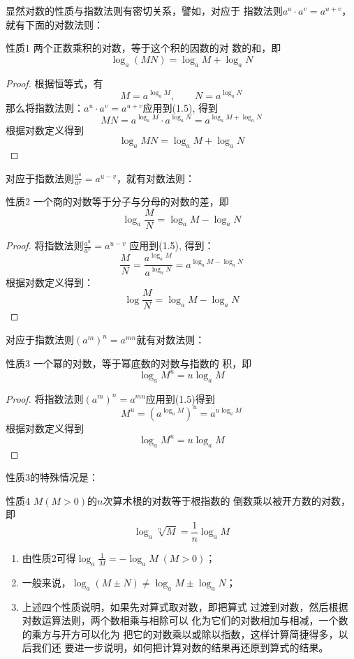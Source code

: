 显然对数的性质与指数法则有密切关系，譬如，对应于
指数法则$a^u\cdot a^v=a^{u+v}$，就有下面的对数法则：

\begin{blk}{性质1}
    两个正数乘积的对数，等于这个积的因数的对
数的和，即
\[\log_a(MN)=\log_a M+\log_a N\]
\end{blk}

\begin{proof}
    根据恒等式，有
    \begin{equation}
        M=a^{\log_a M},\qquad N=a^{\log_a N}
    \end{equation}
    那么将指数法则：$a^u\cdot a^v=a^{u+v}$应用到(1.5), 得到
\[MN=a^{\log_a M}\cdot a^{\log_a N}=a^{\log_a M+\log_a N}\]
    根据对数定义得到
    \[\log_a MN = \log_a M + \log_a N\]
\end{proof}    

对应于指数法则$\frac{a^u}{a^v}=a^{u-v}$，就有对数法则：
    
\begin{blk}{性质2}
    一个商的对数等于分子与分母的对数的差，即
    \[\log_a \frac{M}{N}=\log_a M-\log_a N\]
\end{blk}

\begin{proof}
将指数法则$\frac{a^u}{a^v}=a^{u-v}$
应用到(1.5), 得到：
\[\frac{M}{N}=\frac{a^{\log_a M}}{a^{\log_a N}}=a^{\log_a M-\log_a N}\]
根据对数定义得到：
\[\log\frac{M}{N}=\log_a M -\log_a N\]
\end{proof}    

对应于指数法则$(a^m)^n=a^{mn}$就有对数法则： 
\begin{blk}{性质3}
    一个幂的对数，等于幂底数的对数与指数的
积，即
\[\log_a M^u =u\log_a M\]
\end{blk}
  
\begin{proof}
    将指数法则$(a^m)^n=a^{mn}$应用到(1.5)得到
\[M^u=\left(a^{\log_a M}\right)^u=a^{u\log_a M}\]
根据对数定义得到
\[\log_a M^u = u\log_a M\]
\end{proof}
    
性质3的特殊情况是：

\begin{blk}{性质4}
 $M(M>0)$的$n$次算术根的对数等于根指数的
倒数乘以被开方数的对数，即
\[\log_a\sqrt[n]{M}=\frac{1}{n}\log_a M\]
\end{blk}

\begin{rmk}
    \begin{enumerate}
        \item 由性质2可得$\log_a\frac{1}{M}=-\log_a M\; (M>0)$；
        \item 一般来说，$\log_a(M\pm N)\ne \log_a M\pm \log_a N$；
        \item 上述四个性质说明，如果先对算式取对数，即把算式
        过渡到对数，然后根据对数运算法则，两个数相乘与相除可以
        化为它们的对数相加与相减，一个数的乘方与开方可以化为
        把它的对数乘以或除以指数，这样计算简捷得多，以后我们还
        要进一步说明，如何把计算对数的结果再还原到算式的结果。
    \end{enumerate}
\end{rmk}
    
